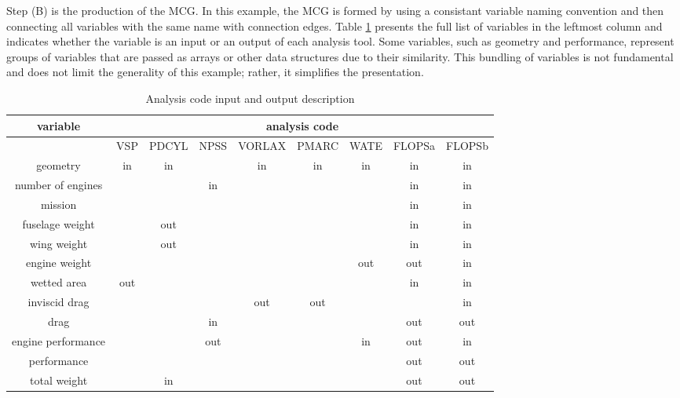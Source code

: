 Step (B) is the production of the MCG.
	In this example, the MCG is formed by using a consistant variable naming convention and then connecting all variables with the same name with connection edges. 
	Table \ref{t:ins and outs} presents the full list of variables in the leftmost column and indicates whether the variable is an input or an output of each analysis tool. 
	Some variables, such as geometry and performance, represent groups of variables that are passed as arrays or other data structures due to their similarity. 
	This bundling of variables is not fundamental and does not limit the generality of this example; rather, it simplifies the presentation.
	\begin{table}[htb!]
	  \centering
	  \caption{Analysis code input and output description}
		\begin{tabular}{ccccccccc}
		\toprule
		variable & \multicolumn{8}{c}{analysis code} \\
		\midrule
			  & VSP   & PDCYL & NPSS  & VORLAX & PMARC & WATE  & FLOPSa & FLOPSb \\
		geometry & in    & in    &       & in    & in    & in    & in    & in \\
		number of engines &       &       & in    &       &       &       & in    & in \\
		mission &       &       &       &       &       &       & in    & in \\
		fuselage weight &       & out   &       &       &       &       & in    & in \\
		wing weight &       & out   &       &       &       &       & in    & in \\
		engine weight &       &       &       &       &       & out   & out   & in \\
		wetted area & out   &       &       &       &       &       & in    & in \\
		inviscid drag &       &       &       & out   & out   &       &       & in \\
		drag  &       &       & in    &       &       &       & out   & out \\
		engine performance &       &       & out   &       &       & in    & out   & in \\
		performance &       &       &       &       &       &       & out   & out \\
		total weight &       & in    &       &       &       &       & out   & out \\
		\bottomrule
		\end{tabular}
	  \label{t:ins and outs}
	\end{table}

